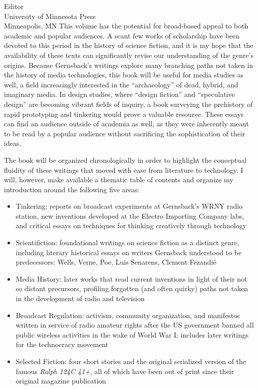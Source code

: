 \documentclass[a4paper,12pt]{letter}
\begin{document}
\begin{letter}{Editor \\ University of Minnesota Press \\ Minneapolis, MN}
This volume has the potential for broad-based appeal to both academic
and popular audiences. A scant few works of scholarship have been
devoted to this period in the history of science fiction, and it is my
hope that the availability of these texts can significantly revise our
understanding of the genre's origins. Because Gernsback's writings
explore many branching paths not taken in the history of media
technologies, this book will be useful for media studies as well, a
field increasingly interested in the ``archaeology'' of dead, hybrid,
and imaginary media. In design studies, where ``design fiction'' and
``speculative design'' are becoming vibrant fields of inquiry, a book
surveying the prehistory of rapid prototyping and tinkering would prove
a valuable resource. These essays can find an audience outside of
academia as well, as they were inherently meant to be read by a popular
audience without sacrificing the sophistication of their ideas.

The book will be organized chronologically in order to highlight the
conceptual fluidity of these writings that moved with ease from
literature to technology. I will, however, make available a thematic
table of contents and organize my introduction around the following five
areas:

\begin{itemize}
\itemsep1pt\parskip0pt
\item
  Tinkering: reports on broadcast experiments at Gernsback's WRNY radio
  station, new inventions developed at the Electro Importing Company
  labs, and critical essays on techniques for thinking creatively
  through technology
\item
  Scientifiction: foundational writings on science fiction as a distinct
  genre, including literary historical essays on writers Gernsback
  understood to be predecessors: Wells, Verne, Poe, Luis Senarens,
  Clement Fezandié
\item
  Media History: later works that read current inventions in light of
  their not so distant precursors, profiling forgotten (and often
  quirky) paths not taken in the development of radio and television
\item
  Broadcast Regulation: activism, community organization, and manifestos
  written in service of radio amateur rights after the US government
  banned all public wireless activities in the wake of World War I;
  includes later writings for the technocracy movement
\item
  Selected Fiction: four short stories and the original serialized
  version of the famous \emph{Ralph 124C 41+}, all of which have been
  out of print since their original magazine publication
\end{itemize}


\end{letter}
\end{document}
